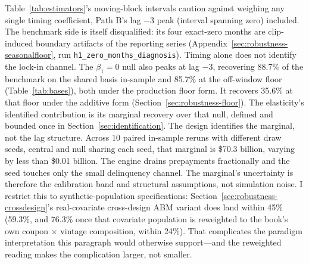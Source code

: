 \documentclass[12pt]{article}
\begin{document}
Table~\ref{tab:estimators}'s moving-block intervals caution against weighing any single timing coefficient, Path B's lag $-3$ peak (interval spanning zero) included. The benchmark side is itself disqualified: its four exact-zero months are clip-induced boundary artifacts of the reporting series (Appendix~\ref{sec:robustness-seasonalfloor}, run \texttt{h1\_zero\_months\_diagnosis}). Timing alone does not identify the lock-in channel. The $\beta_1 = 0$ null also peaks at lag $-3$, recovering 88.7\% of the benchmark on the shared basis in-sample and 85.7\% at the off-window floor (Table~\ref{tab:bases}), both under the production floor form. It recovers 35.6\% at that floor under the additive form (Section~\ref{sec:robustness-floor}). The elasticity's identified contribution is its marginal recovery over that null, defined and bounded once in Section~\ref{sec:identification}. The design identifies the marginal, not the lag structure. Across 10 paired in-sample reruns with different draw seeds, central and null sharing each seed, that marginal is \$70.3 billion, varying by less than \$0.01 billion. The engine drains prepayments fractionally and the seed touches only the small delinquency channel. The marginal's uncertainty is therefore the calibration band and structural assumptions, not simulation noise. I restrict this to synthetic-population specifications: Section~\ref{sec:robustness-crossdesign}'s real-covariate cross-design ABM variant does land within 45\% (59.3\%, and 76.3\% once that covariate population is reweighted to the book's own coupon $\times$ vintage composition, within 24\%). That complicates the paradigm interpretation this paragraph would otherwise support---and the reweighted reading makes the complication larger, not smaller.
\end{document}
